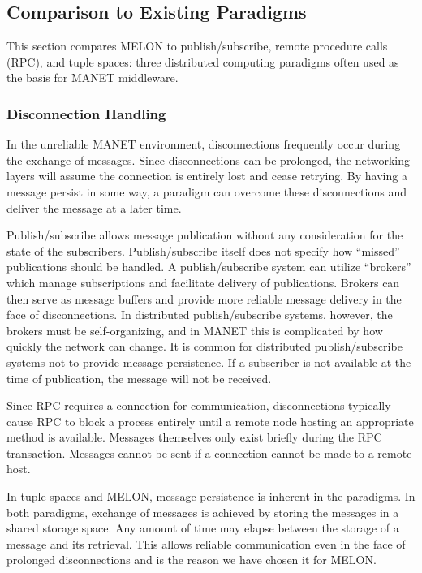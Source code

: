 \documentclass[lnicst]{svmultln}
\begin{document}
\subsection{Comparison to Existing Paradigms}

This section compares MELON to publish/subscribe, remote procedure calls (RPC), and tuple spaces: three distributed computing paradigms often used as the basis for MANET middleware.

\subsubsection{Disconnection Handling}

In the unreliable MANET environment, disconnections frequently occur during the exchange of messages. Since disconnections can be prolonged, the networking layers will assume the connection is entirely lost and cease retrying. By having a message persist in some way, a paradigm can overcome these disconnections and deliver the message at a later time.

Publish/subscribe allows message publication without any consideration for the state of the subscribers. Publish/subscribe itself does not specify how ``missed'' publications should be handled. A publish/subscribe system can utilize ``brokers'' which manage subscriptions and facilitate delivery of publications. Brokers can then serve as message buffers and provide more reliable message delivery in the face of disconnections. In distributed publish/subscribe systems, however, the brokers must be self-organizing, and in MANET this is complicated by how quickly the network can change. It is common for distributed publish/subscribe systems not to provide message persistence. If a subscriber is not available at the time of publication, the message will not be received.

Since RPC requires a connection for communication, disconnections typically cause RPC to block a process entirely until a remote node hosting an appropriate method is available. Messages themselves only exist briefly during the RPC transaction. Messages cannot be sent if a connection cannot be made to a remote host.
    
In tuple spaces and MELON, message persistence is inherent in the paradigms. In both paradigms, exchange of messages is achieved by storing the messages in a shared storage space. Any amount of time may elapse between the storage of a message and its retrieval. This allows reliable communication even in the face of prolonged disconnections and is the reason we have chosen it for MELON.
\end{document}
